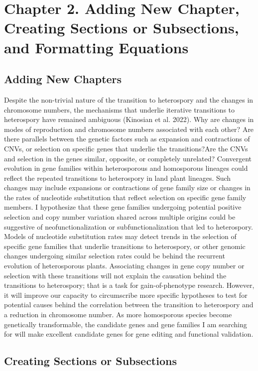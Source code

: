 \chapter{Chapter 2. Adding New Chapter, Creating Sections or Subsections, and Formatting Equations}

\section{Adding New Chapters}
Despite the non-trivial nature of the transition to heterospory and the changes in chromosome numbers, the mechanisms that underlie iterative transitions to heterospory have remained ambiguous (Kinosian et al. 2022). Why are changes in modes of reproduction and chromosome numbers associated with each other? Are there parallels between the genetic factors such as expansion and contractions of CNVs, or selection on specific genes that underlie the transitions?Are the CNVs and selection in the genes similar, opposite, or completely unrelated?
Convergent evolution in gene families within heterosporous and homosporous lineages could reflect the repeated transitions to heterospory in land plant lineages. Such changes may include expansions or contractions of gene family size or changes in the rates of nucleotide substitution that reflect selection on specific gene family members. I hypothesize that these gene families undergoing potential positive selection and copy number variation shared across multiple origins could be suggestive of neofunctionalization or subfunctionalization that led to heterospory. Models of nucleotide substitution rates may detect trends in the selection of specific gene families that underlie transitions to heterospory, or  other genomic changes undergoing similar selection rates could be behind the recurrent evolution of heterosporous plants.
Associating changes in gene copy number or selection with these transitions will not explain the causation behind the transitions to heterospory; that is a task for gain-of-phenotype research. However, it will improve our capacity to circumscribe more specific hypotheses to test for potential causes behind the correlation between the transition to heterospory and a reduction in chromosome number. As more homosporous species become genetically transformable, the candidate genes and gene families I am searching for will make excellent candidate genes for gene editing and functional validation.  
\section{Creating Sections or Subsections}
